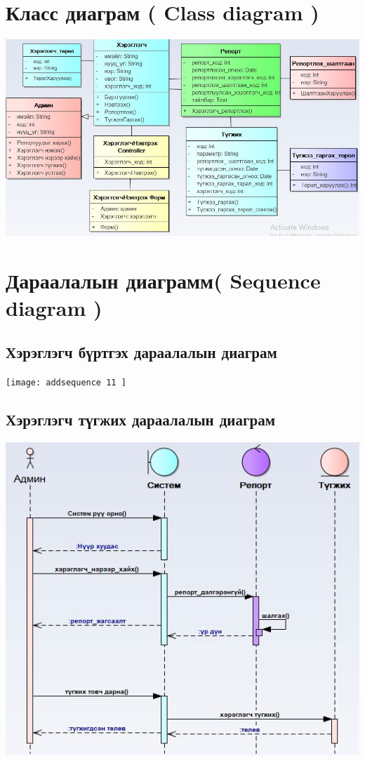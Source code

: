 \documentclass[
oneside, %
english, %
onehalfspacing, %
nolistspacing, %
headsepline, %
]{article} %
\begin{document}
      \section{Класс диаграм ( Class diagram )}
     \includegraphics[width=\textwidth]{class}
     \section{Дараалалын диаграмм( Sequence diagram )}
           \subsection{Хэрэглэгч бүртгэх дараалалын диаграм}
     \texttt{[image: addsequence	11	]}
     \subsection{Хэрэглэгч түгжих дараалалын диаграм}
     \includegraphics[width=\textwidth]{sequence1}
\end{document}
